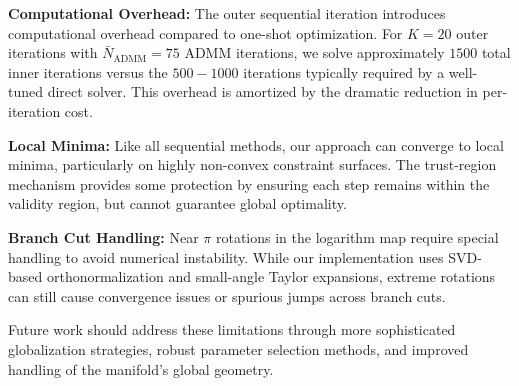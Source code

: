 \textbf{Computational Overhead:} The outer sequential iteration introduces computational overhead compared to one-shot optimization. For $K = 20$ outer iterations with $\bar{N}_{\text{ADMM}} = 75$ ADMM iterations, we solve approximately $1500$ total inner iterations versus the $500-1000$ iterations typically required by a well-tuned direct solver. This overhead is amortized by the dramatic reduction in per-iteration cost.

\textbf{Local Minima:} Like all sequential methods, our approach can converge to local minima, particularly on highly non-convex constraint surfaces. The trust-region mechanism provides some protection by ensuring each step remains within the validity region, but cannot guarantee global optimality.

\textbf{Branch Cut Handling:} Near $\pi$ rotations in the logarithm map require special handling to avoid numerical instability. While our implementation uses SVD-based orthonormalization and small-angle Taylor expansions, extreme rotations can still cause convergence issues or spurious jumps across branch cuts.

Future work should address these limitations through more sophisticated globalization strategies, robust parameter selection methods, and improved handling of the manifold's global geometry.
